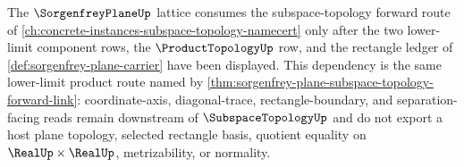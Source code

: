 The $\SorgenfreyPlaneUp$ lattice consumes the subspace-topology forward route of \autoref{ch:concrete-instances-subspace-topology-namecert} only after the two lower-limit component rows, the $\ProductTopologyUp$ row, and the rectangle ledger of \autoref{def:sorgenfrey-plane-carrier} have been displayed. This dependency is the same lower-limit product route named by \autoref{thm:sorgenfrey-plane-subspace-topology-forward-link}: coordinate-axis, diagonal-trace, rectangle-boundary, and separation-facing reads remain downstream of $\SubspaceTopologyUp$ and do not export a host plane topology, selected rectangle basis, quotient equality on $\RealUp\times\RealUp$, metrizability, or normality.
